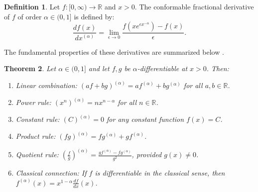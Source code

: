 \documentclass[oneside,10pt]{article}
\theoremstyle{plain}
\newtheorem{theorem}{Theorem}[section]
\theoremstyle{definition}
\newtheorem{definition}[theorem]{Definition}
\begin{document}
\begin{definition}\label{def:Katugampola_der}
Let $f:[0,\infty) \to \mathbb{R}$ and $x > 0$. The conformable fractional derivative of $f$ of order $\alpha \in (0,1]$ is defined by:
\begin{equation}\label{eq:conf_katugampola}
\frac{df(x)}{dx^{(\alpha)}} = \lim_{\epsilon \to 0} \frac{f(x e^{\epsilon x^{-\alpha}}) - f(x)}{\epsilon}.
\end{equation}
\end{definition}

The fundamental properties of these derivatives are summarized below \cite{Katugampola2014, Khalil2014}.

\begin{theorem}\label{thm:conf_properties}
Let $\alpha \in (0,1]$ and let $f, g$ be $\alpha$-differentiable at $x > 0$. Then:
\begin{enumerate}
    \item Linear combination: $(af + bg)^{(\alpha)} = a f^{(\alpha)} + b g^{(\alpha)}$ for all $a, b \in \mathbb{R}$.
    \item Power rule: $(x^n)^{(\alpha)} = n x^{n-\alpha}$ for all $n \in \mathbb{R}$.
    \item Constant rule: $(C)^{(\alpha)} = 0$ for any constant function $f(x) = C$.
    \item Product rule: $(fg)^{(\alpha)} = f g^{(\alpha)} + g f^{(\alpha)}$.
    \item Quotient rule: $\left(\frac{f}{g}\right)^{(\alpha)} = \frac{g f^{(\alpha)} - f g^{(\alpha)}}{g^2}$, provided $g(x) \neq 0$.
    \item Classical connection: If $f$ is differentiable in the classical sense, then $f^{(\alpha)}(x) = x^{1-\alpha} \frac{df}{dx}(x)$.
\end{enumerate}
\end{theorem}
\end{document}
